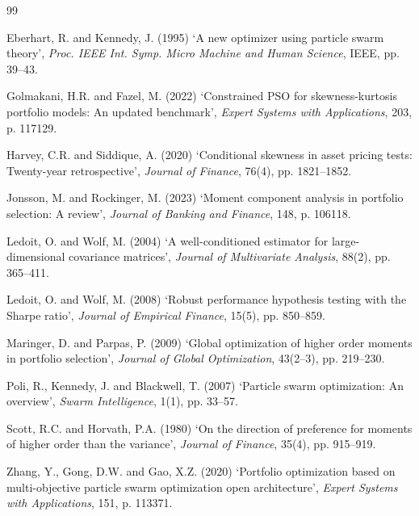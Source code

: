 \documentclass[12pt,a4paper]{article}
\begin{document}
	\begin{thebibliography}{99}
		
		Eberhart, R. and Kennedy, J. (1995) `A new optimizer using particle swarm theory', 
		\textit{Proc. IEEE Int. Symp. Micro Machine and Human Science}, IEEE, pp. 39--43.
		
		Golmakani, H.R. and Fazel, M. (2022) `Constrained PSO for skewness-kurtosis portfolio 
		models: An updated benchmark', \textit{Expert Systems with Applications}, 203, p. 117129.
		
		Harvey, C.R. and Siddique, A. (2020) `Conditional skewness in asset pricing tests: 
		Twenty-year retrospective', \textit{Journal of Finance}, 76(4), pp. 1821--1852.
		
		Jonsson, M. and Rockinger, M. (2023) `Moment component analysis in portfolio selection: 
		A review', \textit{Journal of Banking and Finance}, 148, p. 106118.
		
		Ledoit, O. and Wolf, M. (2004) `A well-conditioned estimator for large-dimensional 
		covariance matrices', \textit{Journal of Multivariate Analysis}, 88(2), pp. 365--411.
		
		Ledoit, O. and Wolf, M. (2008) `Robust performance hypothesis testing with the Sharpe 
		ratio', \textit{Journal of Empirical Finance}, 15(5), pp. 850--859.
		
		Maringer, D. and Parpas, P. (2009) `Global optimization of higher order moments in 
		portfolio selection', \textit{Journal of Global Optimization}, 43(2--3), pp. 219--230.
		
		Poli, R., Kennedy, J. and Blackwell, T. (2007) `Particle swarm optimization: An overview', 
		\textit{Swarm Intelligence}, 1(1), pp. 33--57.
		
		Scott, R.C. and Horvath, P.A. (1980) `On the direction of preference for moments of 
		higher order than the variance', \textit{Journal of Finance}, 35(4), pp. 915--919.
		
		Zhang, Y., Gong, D.W. and Gao, X.Z. (2020) `Portfolio optimization based on multi-objective 
		particle swarm optimization open architecture', \textit{Expert Systems with Applications}, 
		151, p. 113371.
		
	\end{thebibliography}
	
\end{document}
